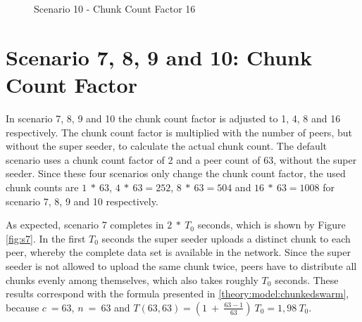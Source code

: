 \pagebreak
\begin{figure}[!ht]
	\begin{center}	
		~ %

	 	~ %

		\caption{Scenario 10 - Chunk Count Factor 16}
		\label{fig:s10}
	\end{center}
\end{figure}
\vfill

\pagebreak
\section{Scenario 7, 8, 9 and 10: Chunk Count Factor}
\label{evaluation:78910}

In scenario 7, 8, 9 and 10 the chunk count factor is adjusted to 1, 4, 8 and 16 respectively. The chunk count factor is multiplied with the number of peers, but without the super seeder, to calculate the actual chunk count. The default scenario uses a chunk count factor of 2 and a peer count of 63, without the super seeder. Since these four scenarios only change the chunk count factor, the used chunk counts are $1\:*\:63$, $4\:*\:63=252$, $8\:*\:63=504$ and $16\:*\:63=1008$ for scenario 7, 8, 9 and 10 respectively.   

As expected, scenario 7 completes in $2\:*\:T_0$ seconds, which is shown by Figure \ref{fig:s7}. In the first $T_0$ seconds the super seeder uploads a distinct chunk to each peer, whereby the complete data set is available in the network. Since the super seeder is not allowed to upload the same chunk twice, peers have to distribute all chunks evenly among themselves, which also takes roughly $T_0$ seconds. These results correspond with the formula presented in \ref{theory:model:chunkedswarm}, because $c\:=63$, $n\:=\:63$ and $T(63, 63) = (1\:+\:\frac{63-1}{63})\:T_0 = 1,98\:T_0$.

